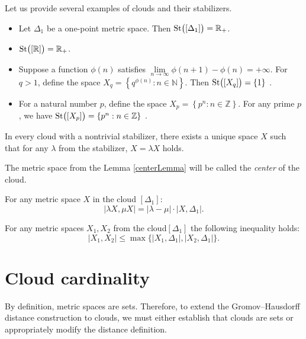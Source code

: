 \documentclass[leqno]{article}
\begin{document}
Let us provide several examples of clouds and their stabilizers.

\begin{itemize}
    \item Let $\Delta_1$ be a one-point metric space. Then $\operatorname{St}\bigl([\Delta_1]\bigr) = \mathbb{R}_+$.
    \item $\operatorname{St}\bigl([\mathbb{R}]\bigr) = \mathbb{R}_+$.
    \item Suppose a function $\phi(n)$ satisfies $\lim\limits_{n \rightarrow \infty} \phi(n + 1) - \phi(n) = +\infty$. For $q > 1$, define the space $X_q = \left\{q^{\phi(n)}: n \in \mathbb{N}\right\}$. Then $\operatorname{St}\bigl([X_q]\bigr) = \{1\}$ \cite{TuzhBog1}.
    \item For a natural number $p$, define the space $X_p = \left\{p^n : n \in \mathbb{Z}\right\}$. For any prime $p$, we have $\operatorname{St}\bigl([X_p]\bigr) = \left\{p^n : n \in \mathbb{Z}\right\}$ \cite{BogBog1}.
\end{itemize}

\begin{lemma}
    In every cloud with a nontrivial stabilizer, there exists a unique space $X$ such that for any $\lambda$ from the stabilizer, $X = \lambda X$ holds.
    \label{centerLemma}
\end{lemma}

\begin{defin}
	The metric space from the Lemma \ref{centerLemma} will be called the \emph{center} of the cloud.
\end{defin}
\begin{remark} For any metric space $X$ in the cloud $[\Delta_1]$:
	$$|\lambda X, \mu X| = |\lambda - \mu|\cdot|X,\Delta_1|.$$
\end{remark} \begin{remark} For any metric spaces $X_{1}, X_{2}$ from the cloud$[\Delta_{1}]$ the following inequality holds:
	$$|X_{1},X_{2}| \le \max\{|X_{1}, \Delta_{1}|,|X_{2},\Delta_{1}|\}.$$
	\label{remUltraMetric}
\end{remark}
\section{Cloud cardinality}

By definition, metric spaces are sets. Therefore, to extend the Gromov--Hausdorff distance construction to clouds, we must either establish that clouds are sets or appropriately modify the distance definition.
\end{document}
